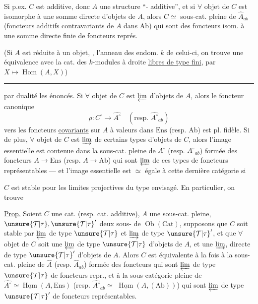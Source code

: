 Si p.ex. $C$ est additive, donc $A$
 une structure ``-
additive'', et si $\forall$ objet de $C$
est isomorphe à une somme
directe  d'objets de $A$, alors
$C\simeq$ sous-cat. pleine de $\widehat A_{ab}$
(foncteurs additifs contravariants
de $A$ dans $\mathrm{Ab}$) qui sont des
foncteurs isom. à une somme
directe finie de foncteurs représ.

(Si $A$ est réduite à un objet, , l'anneau
des endom. $k$ de celui-ci, on
trouve une équivalence avec la
cat. des $k$-modules à droite
\uline{libres de type fini}, par $X\longmapsto\operatorname{Hom}(A,X)$)
\par\bigskip\hrule\bigskip
{} par dualité les énoncés.
Si $\forall$ objet de $C$ est $\varprojlim$
d'objets de $A$, alors le foncteur
canonique
\[
\rho:C^\circ\longrightarrow\widehat{A^\circ}
\quad(\text{resp. }\widehat{A^\circ}_{ab})
\]
vers les foncteurs
\uline{covariants} sur $A$ à valeurs dans
$\mathrm{Ens}$ (resp. $\mathrm{Ab}$) est pl. fidèle. Si
de plus, $\forall$ objet de $C$ est
$\varinjlim$ de certains types d'objets
de $C$, alors l'image essentielle est
contenue dans la sous-cat. pleine
de $\widehat{A^\circ}$ (resp. $\widehat{A^\circ}_{ab}$) formée des
foncteurs $A\longrightarrow\mathrm{Ens}$ (resp. $A\longrightarrow\mathrm{Ab}$)
qui sont $\varprojlim$ de ces types de
foncteurs représentables --- et
l'image essentielle est $\simeq$ égale à
cette dernière catégorie si

$C$ est stable pour les limites projectives
du type envisagé.
En particulier, on trouve

\uline{Prop.} Soient $C$ une cat. (resp. cat.
additive), $A$ une sous-cat. pleine,
$\unsure{\mathcal{T}|\tau},\unsure{\mathcal{T}|\tau}'$ deux sous-
de $\operatorname{Ob}(\mathrm{Cat})$, supposons que $C$ soit
stable par $\varprojlim$ de type $\unsure{\mathcal{T}|\tau}$ et $\varinjlim$
de type $\unsure{\mathcal{T}|\tau}'$, et que $\forall$ objet de
$C$ soit une $\varprojlim$  de type $\unsure{\mathcal{T}|\tau}$ d'objets
de $A$, et une $\varinjlim$, directe de type $\unsure{\mathcal{T}|\tau}'$
d'objets de $A$. Alors $C$ est équivalente
à la fois à la sous-cat. pleine
de $\widehat A$ (resp. $\widehat A_{ab}$)  formée des
foncteurs 
qui sont $\varprojlim$ 
de type $\unsure{\mathcal{T}|\tau}$ de foncteurs repr.,
et à la  sous-catégorie pleine de
$\widehat{A^\circ}\simeq\underline{\operatorname{Hom}}(A,\mathrm{Ens})$
(resp. $\widehat{A^\circ}_{ab}\simeq$
$\underline{\operatorname{Hom}}(A,(\mathrm{Ab}))$) qui sont
$\varprojlim$ de type $\unsure{\mathcal{T}|\tau}'$ de foncteurs
représentables.

